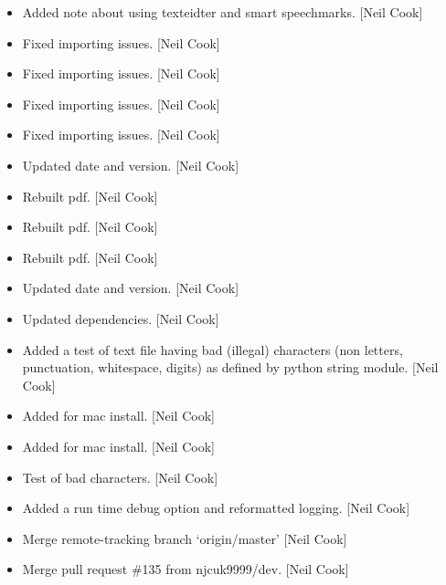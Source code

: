 \documentclass[a4paper,10pt,english]{report}
\begin{document}
\label{\detokenize{misc/changelog:id475}}\begin{itemize}
\item {} 
Added note about using texteidter and smart speechmarks. {[}Neil Cook{]}

\item {} 
Fixed importing issues. {[}Neil Cook{]}

\item {} 
Fixed importing issues. {[}Neil Cook{]}

\item {} 
Fixed importing issues. {[}Neil Cook{]}

\item {} 
Fixed importing issues. {[}Neil Cook{]}

\item {} 
Updated date and version. {[}Neil Cook{]}

\item {} 
Rebuilt pdf. {[}Neil Cook{]}

\item {} 
Rebuilt pdf. {[}Neil Cook{]}

\item {} 
Rebuilt pdf. {[}Neil Cook{]}

\item {} 
Updated date and version. {[}Neil Cook{]}

\item {} 
Updated dependencies. {[}Neil Cook{]}

\item {} 
Added a test of text file having bad (illegal) characters (non
letters, punctuation, whitespace, digits) as defined by python string
module. {[}Neil Cook{]}

\item {} 
Added  for mac install. {[}Neil Cook{]}

\item {} 
Added  for mac install. {[}Neil Cook{]}

\item {} 
Test of bad characters. {[}Neil Cook{]}

\item {} 
Added a run time debug option and reformatted logging. {[}Neil Cook{]}

\item {} 
Merge remote-tracking branch ‘origin/master’ {[}Neil Cook{]}

\item {} 
Merge pull request \#135 from njcuk9999/dev. {[}Neil Cook{]}


\end{itemize}
\end{document}
